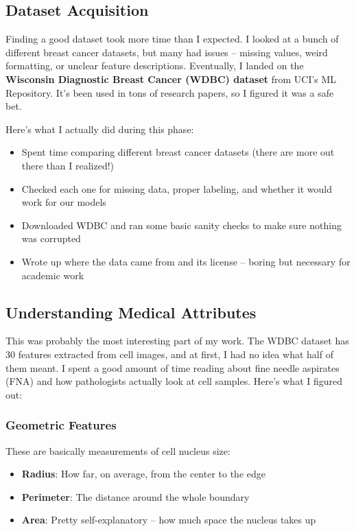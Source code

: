 \documentclass[12pt]{article}
\begin{document}
\subsection{Dataset Acquisition}

Finding a good dataset took more time than I expected. I looked at a bunch of different breast cancer datasets, but many had issues -- missing values, weird formatting, or unclear feature descriptions. Eventually, I landed on the \textbf{Wisconsin Diagnostic Breast Cancer (WDBC) dataset} from UCI's ML Repository. It's been used in tons of research papers, so I figured it was a safe bet.

Here's what I actually did during this phase:
\begin{itemize}
    \item Spent time comparing different breast cancer datasets (there are more out there than I realized!)
    \item Checked each one for missing data, proper labeling, and whether it would work for our models
    \item Downloaded WDBC and ran some basic sanity checks to make sure nothing was corrupted
    \item Wrote up where the data came from and its license -- boring but necessary for academic work
\end{itemize}

\subsection{Understanding Medical Attributes}

This was probably the most interesting part of my work. The WDBC dataset has 30 features extracted from cell images, and at first, I had no idea what half of them meant. I spent a good amount of time reading about fine needle aspirates (FNA) and how pathologists actually look at cell samples. Here's what I figured out:

\subsubsection{Geometric Features}
These are basically measurements of cell nucleus size:
\begin{itemize}
    \item \textbf{Radius}: How far, on average, from the center to the edge
    \item \textbf{Perimeter}: The distance around the whole boundary
    \item \textbf{Area}: Pretty self-explanatory -- how much space the nucleus takes up
\end{itemize}
\end{document}
